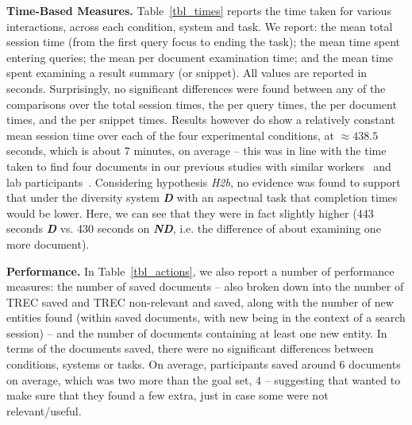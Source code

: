 \vspace{2mm}
\noindent\textbf{Time-Based Measures.} Table~\ref{tbl_times} reports the time taken for various interactions, across each condition, system and task. We report: the mean total session time (from the first query focus to ending the task); the mean time spent entering queries; the mean per document examination time; and the mean time spent examining a result summary (or snippet). All values are reported in seconds. Surprisingly, no significant differences were found between any of the comparisons over the total session times, the per query times, the per document times, and the per snippet times. Results however do show a relatively constant mean session time over each of the four experimental conditions, at $\approx438.5$ seconds, which is about $7$ minutes, on average -- this was in line with the time taken to find four documents in our previous studies with similar workers~\cite{maxwell2017snippet_length} and lab participants~\cite{maxwell2016agents}.
Considering hypothesis \emph{H2b}, no evidence was found to support that under the diversity system \textbf{\emph{D}} with an aspectual task that completion times would be lower. Here, we can see that they were in fact slightly higher (443 seconds \textbf{\emph{D}} vs. 430 seconds on \textbf{\emph{ND}}, i.e. the difference of about examining one more document). 

\vspace{2mm}
\noindent\textbf{Performance.} In Table~\ref{tbl_actions}, we also report a number of performance measures: the number of saved documents -- also broken down into the number of TREC saved and TREC non-relevant and saved, along with the number of new entities found (within saved documents, with new being in the context of a search session) -- and the number of documents containing at least one new entity. In terms of the documents saved, there were no significant differences between conditions, systems or tasks. On average, participants saved around 6 documents on average, which was two more than the goal set, $4$ -- suggesting that wanted to make sure that they found a few extra, just in case some were not relevant/useful.

